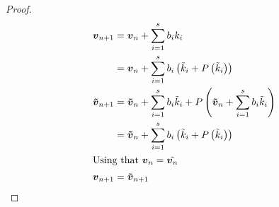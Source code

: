 \begin{proof}
\begin{align*}
{\boldsymbol {v}}_{n+1}&={\boldsymbol {v}}_{n}+\sum_{i=1}^{s}b_{i}k_{i}\\
&={\boldsymbol {v}}_{n}+\sum_{i=1}^{s}b_{i}\left(\tilde{k}_{i}+P\left(\tilde{k}_{i}\right)\right)\\
{\boldsymbol {\tilde{v}}}_{n+1}&={\boldsymbol {\tilde{v}}}_{n}+\sum_{i=1}^{s}b_{i}\tilde{k}_{i}+P\left({\boldsymbol {\tilde{v}}}_{n}+\sum_{i=1}^{s}b_{i}\tilde{k}_{i}\right)\\
&={\boldsymbol {\tilde{v}}}_{n}+\sum_{i=1}^{s}b_{i}\left(\tilde{k}_{i}+P\left(\tilde{k}_{i}\right)\right)\\
\intertext{Using that ${\boldsymbol {v}}_{n}=\tilde{{\boldsymbol {v}}_{n}}$}
{\boldsymbol {v}}_{n+1}&={\boldsymbol {\tilde{v}}}_{n+1}
\end{align*}

\end{proof}

